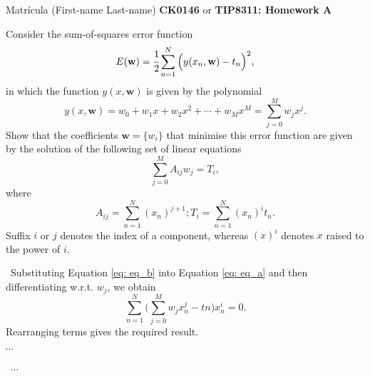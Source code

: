 \documentclass[11pt]{article}
\newenvironment{EX}[2][Exercise]{\begin{trivlist}
\item[{\color{red} \hskip \labelsep {\bfseries #1}\hskip \labelsep {\bfseries #2.}}]}{\end{trivlist}}
\newenvironment{SL}[1][Solution]{\begin{trivlist}
\item[{\color{blue} \hskip \labelsep {\bfseries #1:}}]}{\end{trivlist}}
\begin{document}

\noindent Matr\'icula (First-name Last-name) \hfill {\Large \bfseries CK0146} or {\Large \bfseries TIP8311: Homework A} \\

\begin{EX}{A.1}
Consider the sum-of-squares error function
\begin{equation}
E(\mathbf{w}) = \cfrac{1}{2}\sum_{n=1}^{N}{\Big(y(x_n,\mathbf{w}) - t_n\Big)^2}, \label{eq: eq_a}
\end{equation}
in which the function $y(x,\mathbf{w})$ is given by the polynomial
\begin{equation}
y(x,\mathbf{w}) = w_0 + w_1x + w_2x^2 + \cdots + w_Mx^M = \sum_{j=0}^{M}{w_jx^j}. \label{eq: eq_b}
\end{equation}
Show that the coefficients $\mathbf{w} = \{w_i\}$ that minimise this error function are given by the solution of the following set of linear equations
\begin{equation}
\sum_{j=0}^{M}{A_{ij}w_j} = T_i, \label{eq: eq_c}
\end{equation}  
where 
\begin{subequations}
\begin{equation}
A_{ij} = \sum_{n=1}^{N}{(x_n)^{j+1}}; \label{eq: eq_ca}
\end{equation}
\begin{equation}
T_i = \sum_{n=1}^{N}{(x_n)^it_n}. \label{eq: eq_cb}
\end{equation}
\end{subequations}
Suffix $i$ or $j$ denotes the index of a component, whereas $(x)^i$ denotes $x$ raised to the power of $i$.
\end{EX}

\begin{SL}\
Substituting Equation \ref{eq: eq_b} into Equation \ref{eq: eq_a} and then differentiating w.r.t. $w_j$, we obtain $$\sum_{n=1}^{N}{\Big(\sum_{j=0}^{M}{w_jx_n^j - tn}\Big)x_n^i} = 0.$$ Rearranging terms gives the required result.
\end{SL}


\begin{EX}{A.2}
$\cdots$
\end{EX}

\begin{SL}\
$\cdots$
\end{SL}

\end{document}
